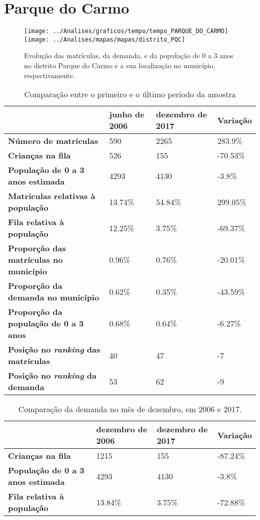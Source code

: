 \section{Parque do Carmo}
\begin{figure}[H]
	\centering
	\texttt{[image: ../Analises/graficos/tempo/tempo\_PARQUE\_DO\_CARMO]}
	\texttt{[image: ../Analises/mapas/mapas/distrito\_PQC]}
	\caption{Evolução das matrículas, da demanda, e da população de 0 a 3 anos no distrito Parque do Carmo e a sua localização no município, respectivamente.}
\end{figure}
\begin{table}[H]
	\begin{tabular}{|l|l|l|l|}
		\hline
		\textbf{}                                      & \textbf{junho de 2006}       & \textbf{dezembro de 2017}    & \textbf{Variação} \\ \hline
		\textbf{Número de matrículas}                  & 590 & 2265 & 283.9\% \\ \hline
		\textbf{Crianças na fila}                      & 526 & 155 & -70.53\% \\ \hline
		\textbf{População de 0 a 3 anos estimada}      & 4293 & 4130 & -3.8\% \\ \hline
		\textbf{Matrículas relativas à população}      & 13.74\% & 54.84\% & 299.05\% \\ \hline
		\textbf{Fila relativa à população}             & 12.25\% & 3.75\% & -69.37\% \\ \hline
		\textbf{Proporção das matrículas no município} & 0.96\% & 0.76\% & -20.01\% \\ \hline
		\textbf{Proporção da demanda no município}     & 0.62\% & 0.35\% & -43.59\% \\ \hline
		\textbf{Proporção da população de 0 a 3 anos}  & 0.68\% & 0.64\% & -6.27\% \\ \hline
		\textbf{Posição no \textit{ranking} das matrículas}     & 40 & 47 & -7 \\ \hline
		\textbf{Posição no \textit{ranking} da demanda}         & 53 & 62 & -9 \\ \hline
	\end{tabular}
	\caption{Comparação entre o primeiro e o último período da amostra}
\end{table}
\begin{table}[H]
	\begin{tabular}{|l|l|l|l|}
		\hline
		\textbf{}                                 & \textbf{dezembro de 2006} & \textbf{dezembro de 2017} & \textbf{Variação} \\ \hline
		\textbf{Crianças na fila}                      & 1215 & 155 & -87.24\% \\ \hline
		\textbf{População de 0 a 3 anos estimada}      & 4293 & 4130 & -3.8\% \\ \hline
		\textbf{Fila relativa à população}             & 13.84\% & 3.75\% & -72.88\% \\ \hline
	\end{tabular}
	\caption{Comparação da demanda no mês de dezembro, em 2006 e 2017.}
\end{table}
